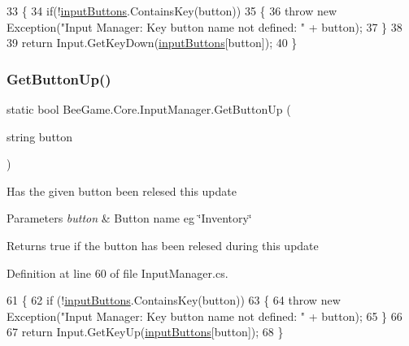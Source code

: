 \begin{DoxyCode}
33         \{
34             \textcolor{keywordflow}{if}(!\hyperlink{class_bee_game_1_1_core_1_1_input_manager_ad0a5b4a5db00803c01ecb3431e208ca1}{inputButtons}.ContainsKey(button))
35             \{
36                 \textcolor{keywordflow}{throw} \textcolor{keyword}{new} Exception(\textcolor{stringliteral}{"Input Manager: Key button name not defined: "} + button);
37             \}
38 
39             \textcolor{keywordflow}{return} Input.GetKeyDown(\hyperlink{class_bee_game_1_1_core_1_1_input_manager_ad0a5b4a5db00803c01ecb3431e208ca1}{inputButtons}[button]);
40         \}
\end{DoxyCode}
\mbox{\label{class_bee_game_1_1_core_1_1_input_manager_a48509279629e2144c23c3d2a9dee4257}} 
\subsubsection{\texorpdfstring{Get\+Button\+Up()}{GetButtonUp()}}
{\footnotesize\ttfamily static bool Bee\+Game.\+Core.\+Input\+Manager.\+Get\+Button\+Up (\begin{DoxyParamCaption}\item[{string}]{button }\end{DoxyParamCaption})\hspace{0.3cm}{\ttfamily [static]}}



Has the given button been relesed this update 


\begin{DoxyParams}{Parameters}
{\em button} & Button name eg \char`\"{}\+Inventory\char`\"{}\\
\hline
\end{DoxyParams}
\begin{DoxyReturn}{Returns}
true if the button has been relesed during this update
\end{DoxyReturn}


Definition at line 60 of file Input\+Manager.\+cs.


\begin{DoxyCode}
61         \{
62             \textcolor{keywordflow}{if} (!\hyperlink{class_bee_game_1_1_core_1_1_input_manager_ad0a5b4a5db00803c01ecb3431e208ca1}{inputButtons}.ContainsKey(button))
63             \{
64                 \textcolor{keywordflow}{throw} \textcolor{keyword}{new} Exception(\textcolor{stringliteral}{"Input Manager: Key button name not defined: "} + button);
65             \}
66 
67             \textcolor{keywordflow}{return} Input.GetKeyUp(\hyperlink{class_bee_game_1_1_core_1_1_input_manager_ad0a5b4a5db00803c01ecb3431e208ca1}{inputButtons}[button]);
68         \}
\end{DoxyCode}



